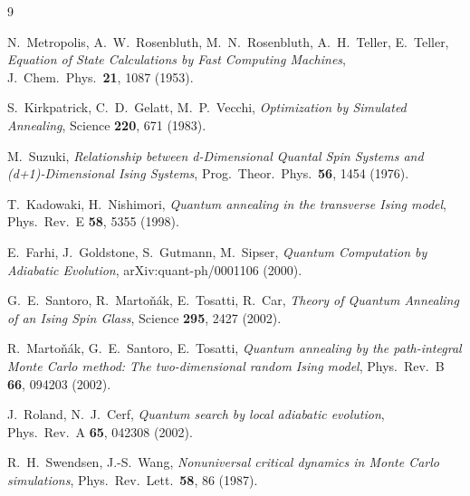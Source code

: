 \begin{thebibliography}{9}
\raggedright

N.~Metropolis, A.~W.~Rosenbluth, M.~N.~Rosenbluth, A.~H.~Teller,
E.~Teller, \emph{Equation of State Calculations by Fast Computing Machines},
J.\ Chem.\ Phys.\ \textbf{21}, 1087 (1953).

S.~Kirkpatrick, C.~D.~Gelatt, M.~P.~Vecchi, \emph{Optimization by Simulated
Annealing}, Science \textbf{220}, 671 (1983).

M.~Suzuki, \emph{Relationship between d-Dimensional Quantal Spin Systems and
(d+1)-Dimensional Ising Systems}, Prog.\ Theor.\ Phys.\ \textbf{56}, 1454
(1976).

T.~Kadowaki, H.~Nishimori, \emph{Quantum annealing in the transverse Ising
model}, Phys.\ Rev.\ E \textbf{58}, 5355 (1998).

E.~Farhi, J.~Goldstone, S.~Gutmann, M.~Sipser, \emph{Quantum Computation by
Adiabatic Evolution}, arXiv:quant-ph/0001106 (2000).

G.~E.~Santoro, R.~Marto\v{n}\'ak, E.~Tosatti, R.~Car, \emph{Theory of
Quantum Annealing of an Ising Spin Glass}, Science \textbf{295}, 2427
(2002).

R.~Marto\v{n}\'ak, G.~E.~Santoro, E.~Tosatti, \emph{Quantum annealing by the
path-integral Monte Carlo method: The two-dimensional random Ising model},
Phys.\ Rev.\ B \textbf{66}, 094203 (2002).

J.~Roland, N.~J.~Cerf, \emph{Quantum search by local adiabatic evolution},
Phys.\ Rev.\ A \textbf{65}, 042308 (2002).

R.~H.~Swendsen, J.-S.~Wang, \emph{Nonuniversal critical dynamics in Monte
Carlo simulations}, Phys.\ Rev.\ Lett.\ \textbf{58}, 86 (1987).

\end{thebibliography}
